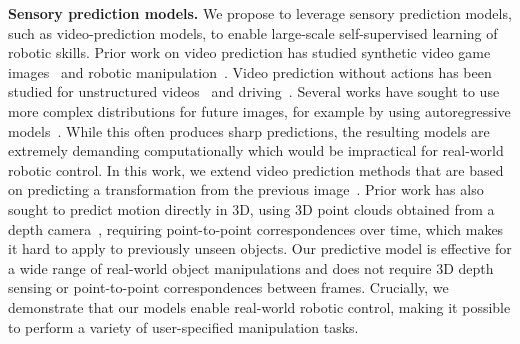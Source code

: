 \noindent \textbf{Sensory prediction models.}
We propose to leverage sensory prediction models, such as video-prediction models, to enable large-scale self-supervised learning of robotic skills. Prior work on video prediction has studied synthetic video game images~\cite{atarioh,recurrentsimulators} and robotic manipulation~\cite{bootsetal,finn_nips,video_pixel_networks}. Video prediction without actions has been studied for unstructured videos~\cite{beyond_mse,convlstm,vondrick} and driving~\cite{prednet,dynamic_filter_networks}. Several works have sought to use more complex distributions for future images, for example by using autoregressive models~\cite{video_pixel_networks,scott_reed}. While this often produces sharp predictions, the resulting models are extremely demanding computationally which would be impractical for real-world robotic control. In this work, we extend video prediction methods that are based on predicting a transformation from the previous image~\cite{finn_nips,dynamic_filter_networks}. Prior work has also sought to predict motion directly in 3D, using 3D point clouds obtained from a depth camera~\cite{se3}, requiring point-to-point correspondences over time, which makes it hard to apply to previously unseen objects. Our predictive model is effective for a wide range of real-world object manipulations and does not require 3D depth sensing or point-to-point correspondences between frames. Crucially, we demonstrate that our models enable real-world robotic control, making it possible to perform a variety of user-specified manipulation tasks.
